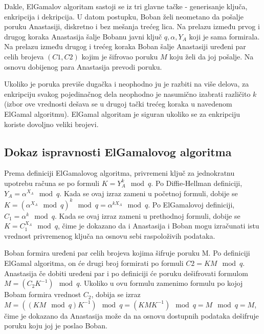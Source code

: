 \documentclass[a4paper]{article}
\begin{document}
 Dakle, ElGamalov algoritam sastoji se iz tri glavne tačke - generisanje ključa, enkripcija i dekripcija. U datom postupku, Boban želi neometano da pošalje poruku Anastasiji, diskretno i bez mešanja trećeg lica. Na prelazu između prvog i drugog koraka Anastasija šalje Bobanu javni ključ ${q,\alpha,Y_A}$ koji je sama formirala. Na prelazu između drugog i trećeg koraka Boban šalje Anastasiji uređeni par celih brojeva $(C1,C2)$ kojim je šifrovao poruku $M$ koju želi da joj pošalje. Na osnovu dobijenog para Anastasija prevodi poruku. 
 
 Ukoliko je poruka previše dugačka i neophodno ju je razbiti na više delova, za enkripciju svakog pojedinačnog dela neophodno je nasumično izabrati različito $k$ (izbor ove vrednosti dešava se u drugoj tački trećeg koraka u navedenom ElGamal algoritmu). ElGamal algoritam je siguran ukoliko se za enkripciju koriste dovoljno veliki brojevi.

\subsection{Dokaz ispravnosti ElGamalovog algoritma}
Prema definiciji ElGamalovog algoritma, privremeni ključ za jednokratnu upotrebu računa se po formuli $K=Y_A^k\mod q$. Po Diffie-Hellman definiciji, $Y_A=\alpha^{X_A}\mod q$. Kada se ovaj izraz zameni u početnoj formuli, dobije se $K=(\alpha^{X_A}\mod q)^k\mod q =\alpha^{kX_A}\mod q$. Po ElGamalovoj definiciji, $C_1=\alpha^k\mod q$. Kada se ovaj izraz zameni u prethodnoj formuli, dobije se $K=C_1^{X_A}\mod q$, čime je dokazano da i Anastasija i Boban mogu izračunati istu vrednost privremenog ključa na osnovu sebi raspoloživih podataka.

Boban formira uređeni par celih brojeva kojima šifruje poruku M. Po definiciji ElGamal algoritma, on će drugi broj formirati po formuli $C2=KM\mod q$. Anastasija če dobiti uređeni par i po definiciji će poruku dešifrovati formulom $M=(C_2K^{-1})\mod q$. Ukoliko u ovu formulu zamenimo formulu po kojoj Bobam formira vrednost $C_2$, dobija se izraz $M=((KM\mod q)K^{-1})\mod q=(KMK^{-1})\mod q=M\mod q=M$, čime je dokazano da Anastasija može da na osnovu dostupnih podataka dešifruje poruku koju joj je poslao Boban.
\end{document}
